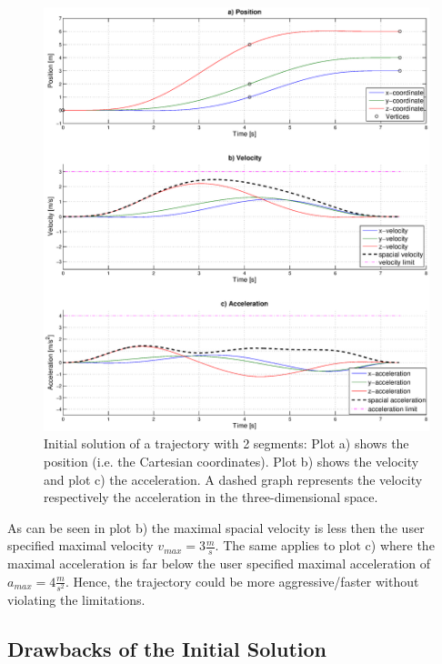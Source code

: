 \begin{figure}[h]
   \centering
   \includegraphics[trim = 35mm 30mm 30mm 15mm,clip,width=1\textwidth]{pics/2SegInit7s43.eps}
   \caption{Initial solution of a trajectory with 2 segments: Plot a) shows the position (i.e. the Cartesian coordinates). Plot b) shows the velocity and plot c) the acceleration. A dashed graph represents the velocity respectively the acceleration in the three-dimensional space.}
   \label{pic:initialSolution}
\end{figure}

As can be seen in plot b) the maximal spacial velocity is less then the user specified maximal velocity $v_{max} = 3\frac{m}{s}$. The same applies to plot c) where the maximal acceleration is far below the user specified maximal acceleration of $a_{max} = 4 \frac{m}{s^2}$. Hence, the trajectory could be more aggressive/faster without violating the limitations. \newline

\subsection{Drawbacks of the Initial Solution}\label{sec:drawbackInitial}


